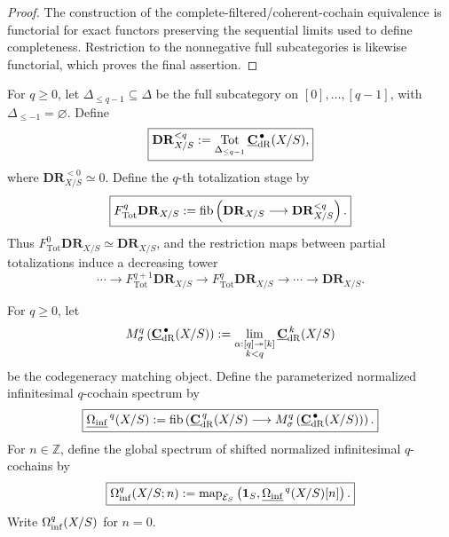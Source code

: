 \begin{proof}
The construction of the complete-filtered/coherent-cochain equivalence is
functorial for exact functors preserving the sequential limits used to define
completeness.  Restriction to the nonnegative full subcategories is likewise
functorial, which proves the final assertion.
\end{proof}

\begin{definition}
\label{def:modal-hodge-filtration}
For \(q\geq0\), let \(\Delta_{\leq q-1}\subseteq\Delta\) be the full subcategory on
\([0],\ldots,[q-1]\), with \(\Delta_{\leq-1}=\varnothing\).  Define
\[
\boxed{
    \mathbf{DR}_{X/S}^{<q}
    :=
    \operatorname*{Tot}_{\Delta_{\leq q-1}}
    \underline{\mathbf C}_{\mathrm{dR}}^{\,\bullet}(X/S),
}
\]
where \(\mathbf{DR}_{X/S}^{<0}\simeq0\).  Define the \(q\)-th totalization stage by
\[
\boxed{
    F_{\mathrm{Tot}}^q\mathbf{DR}_{X/S}
    :=
    \operatorname{fib}
    \left(
        \mathbf{DR}_{X/S}
        \longrightarrow
        \mathbf{DR}_{X/S}^{<q}
    \right).
}
\]
Thus \(F_{\mathrm{Tot}}^0\mathbf{DR}_{X/S}\simeq\mathbf{DR}_{X/S}\), and the restriction maps between partial
totalizations induce a decreasing tower
\[
    \cdots
    \longrightarrow
    F_{\mathrm{Tot}}^{q+1}\mathbf{DR}_{X/S}
    \longrightarrow
    F_{\mathrm{Tot}}^q\mathbf{DR}_{X/S}
    \longrightarrow
    \cdots
    \longrightarrow
    \mathbf{DR}_{X/S}.
\]
\end{definition}

\begin{definition}
\label{def:normalized-modal-de-rham-object}
For \(q\geq0\), let
\[
    M_\sigma^q
    \left(
        \underline{\mathbf C}_{\mathrm{dR}}^{\,\bullet}(X/S)
    \right)
    :=
    \operatorname*{lim}_{\substack{\alpha:[q]\twoheadrightarrow[k]\\ k<q}}
    \underline{\mathbf C}_{\mathrm{dR}}^{\,k}(X/S)
\]
be the codegeneracy matching object.  Define the parameterized normalized infinitesimal \(q\)-cochain spectrum by
\[
\boxed{
    \underline{\Omega_{\mathrm{inf}}}^{\,q}(X/S)
    :=
    \operatorname{fib}
    \left(
        \underline{\mathbf C}_{\mathrm{dR}}^{\,q}(X/S)
        \longrightarrow
        M_\sigma^q
        \left(
            \underline{\mathbf C}_{\mathrm{dR}}^{\,\bullet}(X/S)
        \right)
    \right).
}
\]
For \(n\in\mathbb Z\), define the global spectrum of shifted normalized infinitesimal \(q\)-cochains by
\[
\boxed{
    \Omega_{\mathrm{inf}}^q(X/S;n)
    :=
    \operatorname{map}_{\mathcal E_S}
    \left(
        \mathbf 1_S,
        \underline{\Omega_{\mathrm{inf}}}^{\,q}(X/S)[n]
    \right).
}
\]
Write \(\Omega_{\mathrm{inf}}^q(X/S)\) for \(n=0\).
\end{definition}

